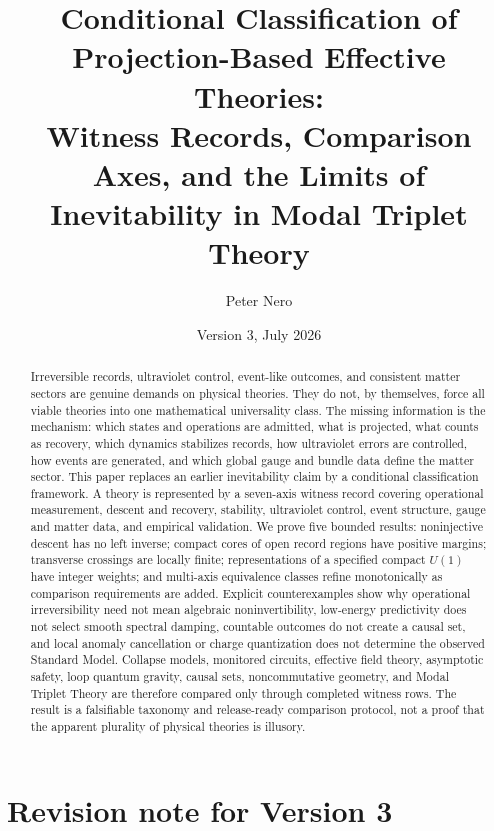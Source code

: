 \documentclass[11pt]{article}
\title{\textbf{Conditional Classification of Projection-Based Effective Theories:}\\
\large Witness Records, Comparison Axes, and the Limits of Inevitability in Modal Triplet Theory}
\author{Peter Nero}
\date{Version 3, July 2026}
\theoremstyle{definition}
\theoremstyle{remark}
\begin{document}
\maketitle

\begin{abstract}
Irreversible records, ultraviolet control, event-like outcomes, and consistent
matter sectors are genuine demands on physical theories. They do not, by
themselves, force all viable theories into one mathematical universality class.
The missing information is the mechanism: which states and operations are
admitted, what is projected, what counts as recovery, which dynamics stabilizes
records, how ultraviolet errors are controlled, how events are generated, and
which global gauge and bundle data define the matter sector. This paper replaces
an earlier inevitability claim by a conditional classification framework. A
theory is represented by a seven-axis witness record covering operational
measurement, descent and recovery, stability, ultraviolet control, event
structure, gauge and matter data, and empirical validation. We prove five
bounded results: noninjective descent has no left inverse; compact cores of open
record regions have positive margins; transverse crossings are locally finite;
representations of a specified compact \(U(1)\) have integer weights; and
multi-axis equivalence classes refine monotonically as comparison requirements
are added. Explicit counterexamples show why operational irreversibility need
not mean algebraic noninvertibility, low-energy predictivity does not select
smooth spectral damping, countable outcomes do not create a causal set, and
local anomaly cancellation or charge quantization does not determine the
observed Standard Model. Collapse models, monitored circuits, effective field
theory, asymptotic safety, loop quantum gravity, causal sets, noncommutative
geometry, and Modal Triplet Theory are therefore compared only through completed
witness rows. The result is a falsifiable taxonomy and release-ready comparison
protocol, not a proof that the apparent plurality of physical theories is
illusory.
\end{abstract}

\section*{Revision note for Version 3}
\end{document}
